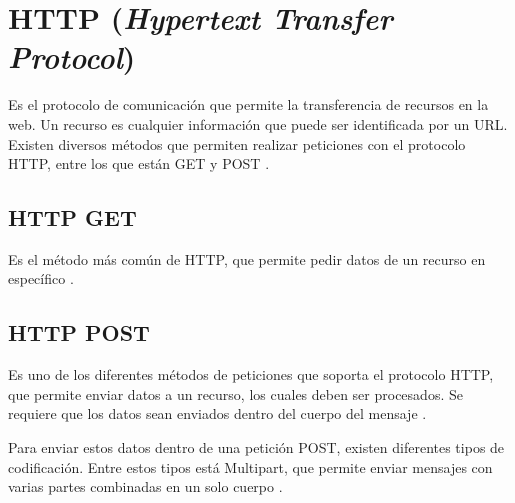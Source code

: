 \section{HTTP (\textit{Hypertext Transfer Protocol})}\label{HTTP}

Es el protocolo de comunicación que permite la transferencia de recursos en la web. Un recurso es cualquier información que puede ser identificada por un URL. Existen diversos métodos que permiten realizar peticiones con el protocolo HTTP, entre los que están GET y POST \cite{HTTP2}.

\subsection{HTTP GET}

Es el método más común de HTTP, que permite pedir datos de un recurso en específico \cite{HTTP3}. 

\subsection{HTTP POST}

Es uno de los diferentes métodos de peticiones que soporta el protocolo HTTP, que permite enviar datos a un recurso, los cuales deben ser procesados. Se requiere que los datos sean enviados dentro del cuerpo del mensaje \cite{HTTP3}.

Para enviar estos datos dentro de una petición POST, existen diferentes tipos de codificación. Entre estos tipos está Multipart, que permite enviar mensajes con varias partes combinadas en un solo cuerpo \cite{HTTP1}.
